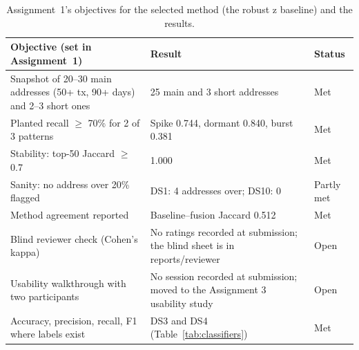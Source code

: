 \begin{table}[htbp]
\centering
\footnotesize
\caption{Assignment~1's objectives for the selected method (the robust z baseline) and the results.}
\label{tab:objectives}
\begin{tabularx}{\textwidth}{@{}Y L{5.6cm} l@{}}
\toprule
Objective (set in Assignment~1) & Result & Status \\
\midrule
Snapshot of 20--30 main addresses (50+ tx, 90+ days) and 2--3 short ones & 25 main and 3 short addresses & Met \\
Planted recall $\geq$ 70\% for 2 of 3 patterns & Spike 0.744, dormant 0.840, burst 0.381 & Met \\
Stability: top-50 Jaccard $\geq$ 0.7 & 1.000 & Met \\
Sanity: no address over 20\% flagged & DS1: 4 addresses over; DS10: 0 & Partly met \\
Method agreement reported & Baseline--fusion Jaccard 0.512 & Met \\
Blind reviewer check (Cohen's kappa) & No ratings recorded at submission; the blind sheet is in reports/reviewer & Open \\
Usability walkthrough with two participants & No session recorded at submission; moved to the Assignment 3 usability study & Open \\
Accuracy, precision, recall, F1 where labels exist & DS3 and DS4 (Table~\ref{tab:classifiers}) & Met \\
\bottomrule
\end{tabularx}
\end{table}

